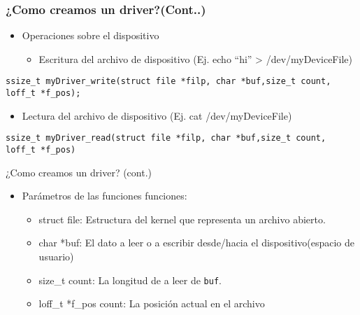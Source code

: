 \begin{frame}[fragile]
\frametitle{¿Como creamos un driver?(Cont..)}
  \begin{itemize}
  \item Operaciones sobre el dispositivo  
  \begin{itemize}
    \item Escritura del archivo de dispositivo (Ej. echo ``hi'' > /dev/myDeviceFile) 
  \end{itemize}	
  \end{itemize}
\begin{lstlisting}
ssize_t myDriver_write(struct file *filp, char *buf,size_t count, loff_t *f_pos);
\end{lstlisting}

\begin{itemize}
  \item Lectura del archivo de dispositivo  (Ej. cat /dev/myDeviceFile)  
 \end{itemize}

\begin{lstlisting}
ssize_t myDriver_read(struct file *filp, char *buf,size_t count, loff_t *f_pos)
\end{lstlisting}
\end{frame}

\begin{frame}{¿Como creamos un driver? (cont.)}
  \begin{itemize}
  \item Parámetros de las funciones funciones:
 	 \begin{itemize}
 	   \item struct file: Estructura del kernel que representa un archivo abierto.
	   \item char *buf: El dato a leer o a escribir desde/hacia el dispositivo(espacio de usuario) 
	   \item size\_t count: La longitud de a leer de \texttt{buf}.
           \item loff\_t *f\_pos count: La posición actual en el archivo
 	 \end{itemize}  
  \end{itemize}
\end{frame}

